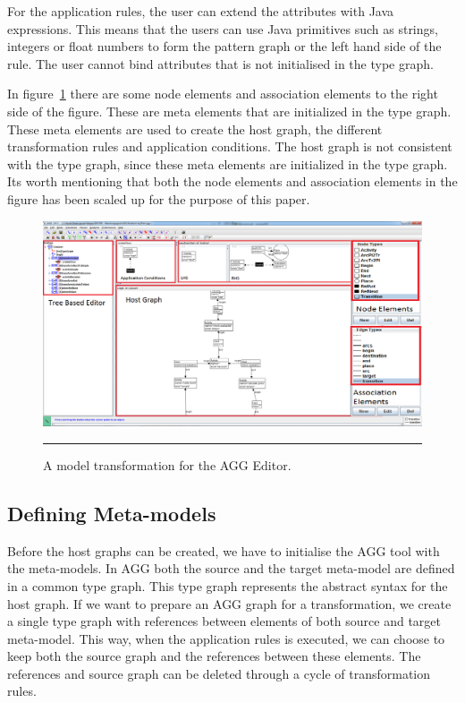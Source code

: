 For the application rules, the user can extend the attributes with Java
expressions. This means that the users can use Java primitives such as strings,
integers or float numbers to form the pattern graph or the left hand side of
the rule. The user cannot bind attributes that is not initialised in the type graph.

In figure~\ref{fig:AGGScreen} there are some node elements and association
elements to the right side of the figure. These are meta elements that are
initialized in the type graph. These meta elements are used to create the host
graph, the different transformation rules and application conditions. The host
graph is not consistent with the type graph, since these meta elements are
initialized in the type graph. Its worth mentioning that both the
node elements and association elements in the figure has been scaled up for the
purpose of this paper.

\begin{figure}[H]
  \centering
    \includegraphics[scale=0.3]{figures/AGGscreen.png}
    \rule{35em}{0.5pt}
  \caption[Graphical Editor for AGG]
  {A model transformation for the AGG Editor.}
  \label{fig:AGGScreen}
\end{figure}

\subsection{Defining Meta-models}

Before the host graphs can be created, we have to initialise the AGG
tool with the meta-models. In AGG both the source and the target meta-model are
defined in a common type graph. This type graph represents the abstract syntax
for the host graph. If we want to prepare an AGG graph for a transformation, we
create a single type graph with references between elements of both source and
target meta-model. This way, when the application rules is executed, we can
choose to keep both the source graph and the references between these elements.
The references and source graph can be deleted through a cycle of transformation rules.

